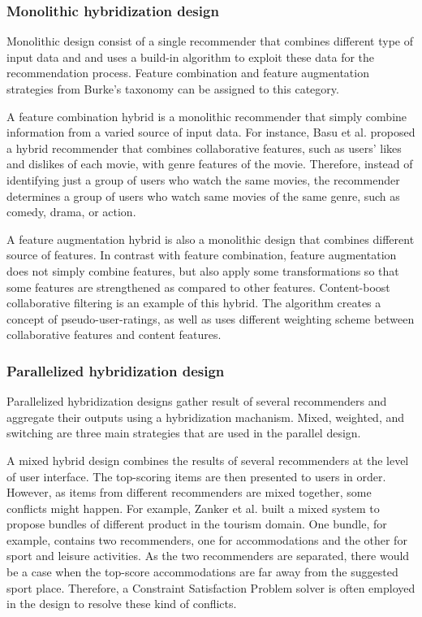 \subsubsection{Monolithic hybridization design}

Monolithic design consist of a single recommender that combines different type of input data and and uses a build-in algorithm to exploit these data for the recommendation process. Feature combination and feature augmentation strategies from Burke's taxonomy \cite{burke2002hybrid} can be assigned to this category. 

A feature combination hybrid is a monolithic recommender that simply combine information from a varied source of input data. For instance, Basu et al. \cite{basu1998recommendation} proposed a hybrid recommender that combines collaborative features, such as users' likes and dislikes of each movie, with genre features of the movie. Therefore, instead of identifying just a group of users who watch the same movies, the recommender determines a group of users who watch same movies of the same genre, such as comedy, drama, or action.

A feature augmentation hybrid is also a monolithic design that combines different source of features. In contrast with feature combination, feature augmentation does not simply combine features, but also apply some transformations so that some features are strengthened as compared to other features. Content-boost collaborative filtering \cite{melville2002content} is an example of this hybrid. The algorithm creates a concept of pseudo-user-ratings, as well as uses different weighting scheme between collaborative features and content features. 

\subsubsection{Parallelized hybridization design}
Parallelized hybridization designs gather result of several recommenders and aggregate their outputs using a hybridization machanism. Mixed, weighted, and switching are three main strategies that are used in the parallel design. 

A mixed hybrid design combines the results of several recommenders at the level of user interface. The top-scoring items are then presented to users in order. However, as items from different recommenders are mixed together, some conflicts might happen. For example, Zanker et al. \cite{zanker2007development} built a mixed system to propose bundles of different product in the tourism domain. One bundle, for example, contains two recommenders, one for accommodations and the other for sport and leisure activities. As the two recommenders are separated, there would be a case when the top-score accommodations are far away from the suggested sport place. Therefore, a Constraint Satisfaction Problem solver is often employed in the design to resolve these kind of conflicts.

